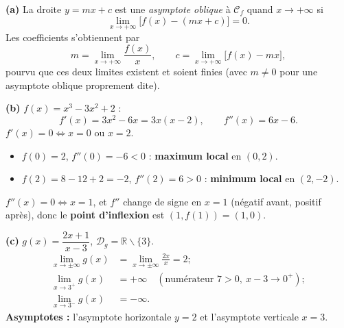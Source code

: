 \documentclass[11pt]{article}
\def\setminus{\mathbin{\backslash}}\let\smallsetminus\setminus
\begin{document}
\begin{corrige}
\textbf{(a)} La droite $y = mx + c$ est une \emph{asymptote oblique} à $\mathcal{C}_f$ quand $x \to +\infty$ si
\[
\lim_{x \to +\infty} \big[ f(x) - (mx + c) \big] = 0.
\]
Les coefficients s'obtiennent par
\[
m = \lim_{x \to +\infty} \frac{f(x)}{x}, \qquad c = \lim_{x \to +\infty} \big[ f(x) - mx \big],
\]
pourvu que ces deux limites existent et soient finies (avec $m \neq 0$ pour une asymptote oblique proprement dite).

\textbf{(b)} $f(x) = x^3 - 3x^2 + 2$ :
\[
f'(x) = 3x^2 - 6x = 3x(x-2), \qquad f''(x) = 6x - 6.
\]
$f'(x) = 0 \iff x = 0$ ou $x = 2$.
\begin{itemize}
    \item $f(0) = 2$, $f''(0) = -6 < 0$ : \textbf{maximum local} en $(0, 2)$.
    \item $f(2) = 8 - 12 + 2 = -2$, $f''(2) = 6 > 0$ : \textbf{minimum local} en $(2, -2)$.
\end{itemize}
$f''(x) = 0 \iff x = 1$, et $f''$ change de signe en $x = 1$ (négatif avant, positif après), donc le \textbf{point d'inflexion} est $(1, f(1)) = (1, 0)$.

\textbf{(c)} $g(x) = \dfrac{2x+1}{x-3}$, $\mathcal{D}_g = \mathbb{R} \setminus \{3\}$.
\begin{align*}
\lim_{x \to \pm\infty} g(x) &= \lim_{x\to\pm\infty}\frac{2x}{x} = 2;\\
\lim_{x \to 3^+} g(x) &= +\infty \quad (\text{numérateur } 7 > 0,\ x - 3 \to 0^+);\\
\lim_{x \to 3^-} g(x) &= -\infty.
\end{align*}
\textbf{Asymptotes :} l'asymptote horizontale $y = 2$ et l'asymptote verticale $x = 3$.
\end{corrige}
\end{document}
